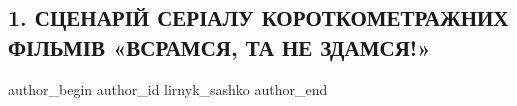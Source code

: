  
 
 
 
 
 
\subsection{1. СЦЕНАРІЙ СЕРІАЛУ  КОРОТКОМЕТРАЖНИХ  ФІЛЬМІВ  «ВСРАМСЯ, ТА НЕ ЗДАМСЯ!»}
\label{sec:20_12_2021.fb.lirnyk_sashko.1.scenarij_vsramsja_ta_ne_zdamsja}
 
\ifcmt
 author_begin
   author_id lirnyk_sashko
 author_end
\fi

